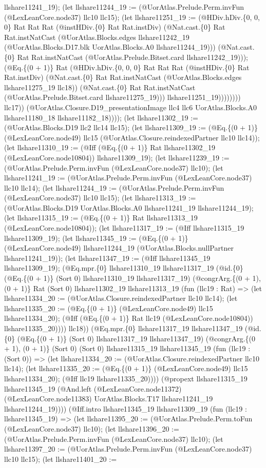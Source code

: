 \documentclass[11pt]{article}
\begin{document}
llshare11241\_19); (let llshare11244\_19 := (@UorAtlas.Prelude.Perm.invFun (@LexLeanCore.node37) llc10 llc15); (let llshare11251\_19 := (@HDiv.hDiv.\{0, 0, 0\} Rat Rat Rat (@instHDiv.\{0\} Rat Rat.instDiv) (@Nat.cast.\{0\} Rat Rat.instNatCast (@UorAtlas.Blocks.edges llshare11242\_19 (@UorAtlas.Blocks.D17.blk UorAtlas.Blocks.A0 llshare11244\_19))) (@Nat.cast.\{0\} Rat Rat.instNatCast (@UorAtlas.Prelude.Bitset.card llshare11242\_19))); (@Eq.\{(0 + 1)\} Rat (@HDiv.hDiv.\{0, 0, 0\} Rat Rat Rat (@instHDiv.\{0\} Rat Rat.instDiv) (@Nat.cast.\{0\} Rat Rat.instNatCast (@UorAtlas.Blocks.edges llshare11275\_19 llc18)) (@Nat.cast.\{0\} Rat Rat.instNatCast (@UorAtlas.Prelude.Bitset.card llshare11275\_19))) llshare11251\_19)))))))) llc17)) (@UorAtlas.Closure.D19\_presentationImage llc4 llc6 UorAtlas.Blocks.A0 llshare11180\_18 llshare11182\_18)))); (let llshare11302\_19 := (@UorAtlas.Blocks.D19 llc2 llc14 llc15); (let llshare11309\_19 := (@Eq.\{(0 + 1)\} (@LexLeanCore.node49) llc15 (@UorAtlas.Closure.reindexedPartner llc10 llc14)); (let llshare11310\_19 := (@Iff (@Eq.\{(0 + 1)\} Rat llshare11302\_19 (@LexLeanCore.node10804)) llshare11309\_19); (let llshare11239\_19 := (@UorAtlas.Prelude.Perm.invFun (@LexLeanCore.node37) llc10); (let llshare11241\_19 := (@UorAtlas.Prelude.Perm.invFun (@LexLeanCore.node37) llc10 llc14); (let llshare11244\_19 := (@UorAtlas.Prelude.Perm.invFun (@LexLeanCore.node37) llc10 llc15); (let llshare11313\_19 := (@UorAtlas.Blocks.D19 UorAtlas.Blocks.A0 llshare11241\_19 llshare11244\_19); (let llshare11315\_19 := (@Eq.\{(0 + 1)\} Rat llshare11313\_19 (@LexLeanCore.node10804)); (let llshare11317\_19 := (@Iff llshare11315\_19 llshare11309\_19); (let llshare11345\_19 := (@Eq.\{(0 + 1)\} (@LexLeanCore.node49) llshare11244\_19 (@UorAtlas.Blocks.nullPartner llshare11241\_19)); (let llshare11347\_19 := (@Iff llshare11345\_19 llshare11309\_19); (@Eq.mpr.\{0\} llshare11310\_19 llshare11317\_19 (@id.\{0\} (@Eq.\{(0 + 1)\} (Sort 0) llshare11310\_19 llshare11317\_19) (@congrArg.\{(0 + 1), (0 + 1)\} Rat (Sort 0) llshare11302\_19 llshare11313\_19 (fun (llc19 : Rat) => (let llshare11334\_20 := (@UorAtlas.Closure.reindexedPartner llc10 llc14); (let llshare11335\_20 := (@Eq.\{(0 + 1)\} (@LexLeanCore.node49) llc15 llshare11334\_20); (@Iff (@Eq.\{(0 + 1)\} Rat llc19 (@LexLeanCore.node10804)) llshare11335\_20)))) llc18)) (@Eq.mpr.\{0\} llshare11317\_19 llshare11347\_19 (@id.\{0\} (@Eq.\{(0 + 1)\} (Sort 0) llshare11317\_19 llshare11347\_19) (@congrArg.\{(0 + 1), (0 + 1)\} (Sort 0) (Sort 0) llshare11315\_19 llshare11345\_19 (fun (llc19 : (Sort 0)) => (let llshare11334\_20 := (@UorAtlas.Closure.reindexedPartner llc10 llc14); (let llshare11335\_20 := (@Eq.\{(0 + 1)\} (@LexLeanCore.node49) llc15 llshare11334\_20); (@Iff llc19 llshare11335\_20)))) (@propext llshare11315\_19 llshare11345\_19 (@And.left (@LexLeanCore.node11372) (@LexLeanCore.node11383) UorAtlas.Blocks.T17 llshare11241\_19 llshare11244\_19)))) (@Iff.intro llshare11345\_19 llshare11309\_19 (fun (llc19 : llshare11345\_19) => (let llshare11395\_20 := (@UorAtlas.Prelude.Perm.toFun (@LexLeanCore.node37) llc10); (let llshare11396\_20 := (@UorAtlas.Prelude.Perm.invFun (@LexLeanCore.node37) llc10); (let llshare11397\_20 := (@UorAtlas.Prelude.Perm.invFun (@LexLeanCore.node37) llc10 llc15); (let llshare11401\_20 := 
\end{document}
